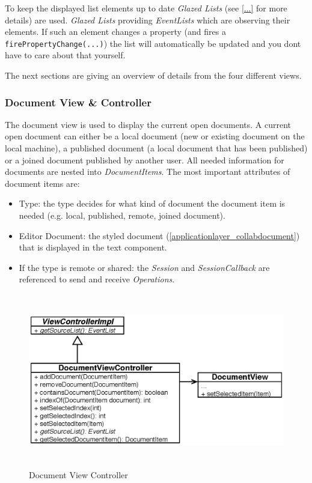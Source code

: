 To keep the displayed list elements up to date \textit{Glazed Lists} (see \ref{...} for more details) are used. \textit{Glazed Lists} providing \textit{EventLists} which are observing their elements. If such an element changes a property (and fires a \texttt{firePropertyChange(...)}) the list will automatically be updated and you dont have to care about that yourself.

The next sections are giving an overview of details from the four different views.

\subsubsection{Document View \& Controller}
The document view is used to display the current open documents. A current open document can either be a local document (new or existing document on the local machine), a published document (a local document that has been published) or a joined document published by another user. All needed information for documents are nested into \textit{DocumentItems}. The most important attributes of document items are:
\begin{itemize}
\item Type: the type decides for what kind of document the document item is needed (e.g. local, published, remote, joined document).
\item Editor Document: the styled document (\ref{applicationlayer_collabdocument}) that is displayed in the text component.
\item If the type is remote or shared: the \textit{Session} and \textit{SessionCallback} are referenced to send and receive \textit{Operations}.
\end{itemize}
\begin{figure}[H]
\begin{center}
  \includegraphics[height=2.99in, width=5.62in]{../images/finalreport/application_documentview.eps}
\caption{Document View Controller}
\label{application_documentview}
\end{center}
\end{figure}
